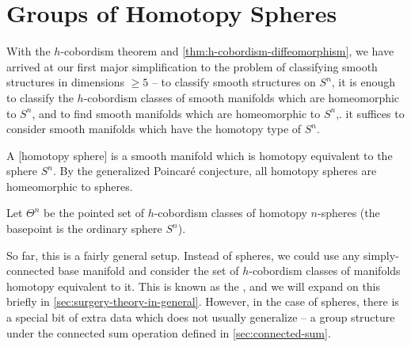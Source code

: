 \pagebreak
\section{Groups of Homotopy Spheres}\label{sec:groups-of-homotopy-spheres}

With the $h$-cobordism theorem and \cref{thm:h-cobordism-diffeomorphism}, we have arrived at our first major simplification to the problem of classifying smooth structures in dimensions $\geq 5$ -- to classify smooth structures on $S^n$, it is enough to classify the $h$-cobordism classes of smooth manifolds which are homeomorphic to $S^n$, and to find smooth manifolds which are homeomorphic to $S^n$,. it suffices to consider smooth manifolds which have the homotopy type of $S^n$.

\begin{definition}
	A [homotopy sphere] is a smooth manifold which is homotopy equivalent to the sphere $S^n$. By the generalized Poincar\'e conjecture, all homotopy spheres are homeomorphic to spheres.
\end{definition}

\begin{definition}
	Let $\Theta^n$ be the pointed set of $h$-cobordism classes of homotopy $n$-spheres (the basepoint is the ordinary sphere $S^n$).
\end{definition}

So far, this is a fairly general setup. Instead of spheres, we could use any simply-connected base manifold and consider the set of $h$-cobordism classes of manifolds homotopy equivalent to it. This is known as the , and we will expand on this briefly in \cref{sec:surgery-theory-in-general}. However, in the case of spheres, there is a special bit of extra data which does not usually generalize -- a group structure under the connected sum operation defined in \cref{sec:connected-sum}.

